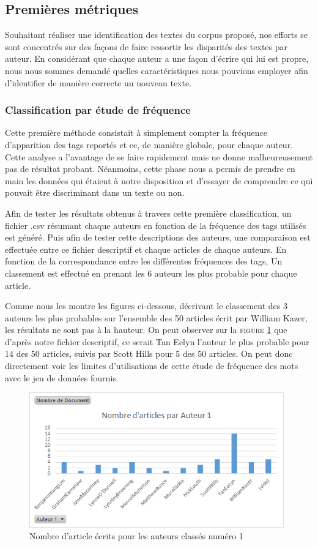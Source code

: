 \documentclass[a4paper,12pt]{report}
\begin{document}
\subsection{Premières métriques}

Souhaitant réaliser une identification des textes du corpus proposé, nos efforts se sont concentrés sur des façons de faire ressortir les disparités des textes par auteur. En considérant que chaque auteur a une façon d'écrire qui lui est propre, nous nous sommes demandé quelles caractéristiques nous pouvions employer afin d'identifier de manière correcte un nouveau texte.

\subsubsection{Classification par étude de fréquence}

Cette première méthode consistait à simplement compter la fréquence d'apparition des tags reportés et ce, de manière globale, pour chaque auteur. Cette analyse a l'avantage de se faire rapidement mais ne donne malheureusement pas de résultat probant. Néanmoins, cette phase nous a permis de prendre en main les données qui étaient à notre disposition et d'essayer de comprendre ce qui pouvait être discriminant dans un texte ou non.

Afin de tester les résultats obtenus à travers cette première classification, un fichier .csv résumant chaque auteurs en fonction de la fréquence des tags utilisés est généré. Puis afin de tester cette descriptions des auteurs, une comparaison est effectuée entre ce fichier descriptif et chaque articles de chaque auteurs. En fonction de la correspondance entre les différentes fréquences des tags, Un classement est effectué en prenant les 6 auteurs les plus probable pour chaque article. 

Comme nous les montre les figures ci-dessous, décrivant le  classement des 3 auteurs les plus probables sur l'ensemble des 50 articles écrit par William Kazer, les résultats ne sont pas à la hauteur. On peut observer sur la \textsc{figure \ref{auteur1}} que d'après notre fichier descriptif, ce serait Tan Eelyn l'auteur le plus probable pour 14 des 50 articles, suivis par Scott Hills pour 5 des 50 articles. On peut donc directement voir les limites d'utilisations de cette étude de fréquence des mots avec le jeu de données fournis. 

\begin{figure}[hbtp]
\centering
\includegraphics[width=11cm]{fig/Auteur1.png}
\caption{Nombre d'article écrits pour les auteurs classés numéro 1}
\label{auteur1}
\end{figure}
\end{document}
